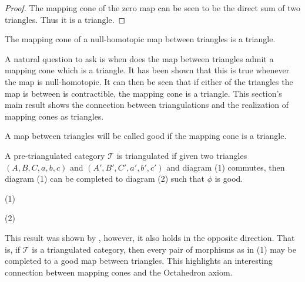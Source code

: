     \begin{proof}
        The mapping cone of the zero map can be seen to be the direct sum of two triangles. Thus it is a triangle.
    \end{proof}

    \begin{corollary}
        The mapping cone of a null-homotopic map between triangles is a triangle.
    \end{corollary}

    A natural question to ask is when does the map between triangles admit a mapping cone which is a triangle. It has been shown that this is true whenever the map is null-homotopic. It can then be seen that if either of the triangles the map is between is contractible, the mapping cone is a triangle. This section's main result shows the connection between triangulations and the realization of mapping cones as triangles.

    \begin{definition}
        A map between triangles will be called good if the mapping cone is a triangle.
    \end{definition}

    \begin{theorem}
        A pre-triangulated category $\mathcal{T}$ is triangulated if given two triangles $(A,B,C,a,b,c)$ and $(A',B',C',a',b',c')$ and diagram (1) commutes, then diagram (1) can be completed to diagram (2) such that $\phi$ is good.
        \begin{center}
            (1)
            (2)
        \end{center}
    \end{theorem}

    This result was shown by \cite{neeman}, however, it also holds in the opposite direction. That is, if $\mathcal{T}$ is a triangulated category, then every pair of morphisms as in (1) may be completed to a good map between triangles. This highlights an interesting connection between mapping cones and the Octahedron axiom. 


